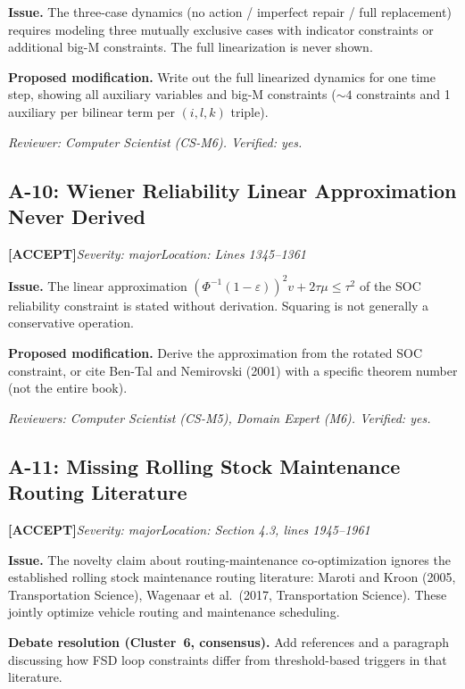 \documentclass[11pt,a4paper]{article}
\newcommand{\acceptlabel}{\textbf{\textcolor{acceptgreen}{[ACCEPT]}}}
\begin{document}
\textbf{Issue.} The three-case dynamics (no action / imperfect repair / full replacement) requires modeling three mutually exclusive cases with indicator constraints or additional big-M constraints. The full linearization is never shown.

\textbf{Proposed modification.} Write out the full linearized dynamics for one time step, showing all auxiliary variables and big-M constraints (${\sim}4$ constraints and 1 auxiliary per bilinear term per $(i,l,k)$ triple).

\textit{Reviewer: Computer Scientist (CS-M6). Verified: yes.}

\bigskip

\subsection{A-10: Wiener Reliability Linear Approximation Never Derived}
\acceptlabel\quad\textit{Severity: major}\quad\textit{Location: Lines 1345--1361}

\textbf{Issue.} The linear approximation $(\Phi^{-1}(1-\varepsilon))^2 v + 2\tau\mu\le\tau^2$ of the SOC reliability constraint is stated without derivation. Squaring is not generally a conservative operation.

\textbf{Proposed modification.} Derive the approximation from the rotated SOC constraint, or cite Ben-Tal and Nemirovski (2001) with a specific theorem number (not the entire book).

\textit{Reviewers: Computer Scientist (CS-M5), Domain Expert (M6). Verified: yes.}

\bigskip

\subsection{A-11: Missing Rolling Stock Maintenance Routing Literature}
\acceptlabel\quad\textit{Severity: major}\quad\textit{Location: Section 4.3, lines 1945--1961}

\textbf{Issue.} The novelty claim about routing-maintenance co-optimization ignores the established rolling stock maintenance routing literature: Maroti and Kroon (2005, Transportation Science), Wagenaar et al.\ (2017, Transportation Science). These jointly optimize vehicle routing and maintenance scheduling.

\textbf{Debate resolution (Cluster~6, consensus).} Add references and a paragraph discussing how FSD loop constraints differ from threshold-based triggers in that literature.
\end{document}
